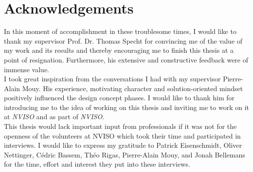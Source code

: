 \chapter*{Acknowledgements}
In this moment of accomplishment in these troublesome times, I would like to thank my supervisor Prof. Dr. Thomas Specht for convincing me of the value of my work and its results and thereby encouraging me to finish this thesis at a point of resignation. Furthermore, his extensive and constructive feedback were of immense value.\\
I took great inspiration from the conversations I had with my supervisor Pierre-Alain Mouy. His experience, motivating character and solution-oriented mindset positively influenced the design concept phases. I would like to thank him for introducing me to the idea of working on this thesis and inviting me to work on it at \emph{NVISO} and as part of \emph{NVISO}.\\
This thesis would lack important input from professionals if it was not for the openness of the volunteers at NVISO which took their time and participated in interviews. I would like to express my gratitude to Patrick Eisenschmidt, Oliver Nettinger, Cédric Bassem, Théo Rigas, Pierre-Alain Mouy, and Jonah Bellemans for the time, effort and interest they put into these interviews.\\

